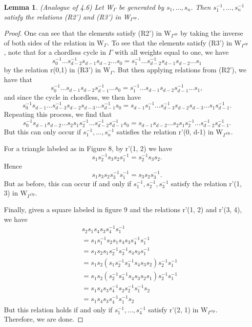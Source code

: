\documentclass[11pt]{amsart}
\newtheorem{lem}[thm]{Lemma}
\theoremstyle{definition}
\begin{document}
\begin{lem} (Analogue of 4.6) 
Let W$_{\Gamma}$ be generated by $s_{1}, \dots, s_{n}$. Then $s_{1}^{-1}, \dots, s_{n}^{-1}$ satisfy the relations (R2') and (R3') in W$_{\Gamma^{op}}$.
\end{lem}
\begin{proof}
One can see that the elements satisfy (R2') in W$_{\Gamma^{op}}$ by taking the inverse of both sides of the relation in W$_{\Gamma}$. To see that the elements satisfy (R3') in W$_{\Gamma^{op}}$, note that for a chordless cycle in $\Gamma$ with all weights equal to one, we have $$s_{0}^{-1}\dots s_{d-2}^{-1}s_{d-1}s_{d-2}\dots s_{0} = s_{1}^{-1}\dots s_{d-2}^{-1}s_{d-1}s_{d-2}\dots s_{1}$$ by the relation r(0,1) in (R3') in W$_{\Gamma}$. But then applying relations from (R2'), we have that $$s_{0}^{-1}\dots s_{d-1}s_{d-2}s_{d-1}^{-1}\dots s_{0} = s_{1}^{-1}\dots s_{d-1}s_{d-2}s_{d-1}^{-1}\dots s_{1},$$ and since the cycle in chordless, we then have $$s_{0}^{-1}s_{d-1}\dots s_{d-3}^{-1}s_{d-2}s_{d-3}\dots s_{d-1}^{-1}s_{0} = s_{d-1}s_{1}^{-1}\dots s_{d-3}^{-1}s_{d-2}s_{d-3}\dots s_{1}s_{d-1}^{-1}.$$ Repeating this process, we find that $$s_{0}^{-1}s_{d-1}s_{d-2}\dots s_{2}s_{1}s_{2}^{-1}\dots s_{d-2}^{-1}s_{d-1}^{-1}s_{0} = s_{d-1}s_{d-2}\dots s_{2}s_{1}s_{2}^{-1}\dots s_{d-2}^{-1}s_{d-1}^{-1}.$$ But this can only occur if $s_{1}^{-1}, \dots, s_{n}^{-1}$ satisfies the relation r'(0, d-1) in W$_{\Gamma^{Op}}.$ 

For a triangle labeled as in Figure 8, by r'(1, 2) we have $$s_{1}s_{2}^{-1}s_{3}s_{2}s_{1}^{-1} = s_{2}^{-1}s_{3}s_{2}.$$ Hence $$s_{1}s_{3}s_{2}s_{3}^{-1}s_{1}^{-1} = s_{3}s_{2}s_{3}^{-1}.$$ But as before, this can occur if and only if $s_{1}^{-1}, s_{2}^{-1}, s_{3}^{-1}$ satisfy the relation r'(1, 3) in W$_{\Gamma^{Op}}$.

Finally, given a square labeled in figure 9 and the relations r'(1, 2) and r'(3, 4), we have 
\begin{align*}
& s_{2}s_{1}s_{4}s_{3}s_{4}^{-1}s_{1}^{-1} \\
&= s_{1}s_{1}^{-1}s_{2}s_{1}s_{4}s_{3}s_{4}^{-1}s_{1}^{-1} \\
&= s_{1}s_{2}s_{1}s_{2}^{-1}s_{3}^{-1}s_{4}s_{3}s_{1}^{-1} \\
&= s_{1}s_{2}(s_{1}s_{2}^{-1}s_{3}^{-1}s_{4}s_{3}s_{2})s_{2}^{-1}s_{1}^{-1} \\
&= s_{1}s_{2}(s_{2}^{-1}s_{3}^{-1}s_{4}s_{3}s_{2}s_{1})s_{2}^{-1}s_{1}^{-1} \\
&= s_{1}s_{4}s_{3}s_{4}^{-1}s_{2}s_{2}^{-1}s_{1}^{-1}s_{2} \\
&= s_{1}s_{4}s_{3}s_{4}^{-1}s_{1}^{-1}s_{2}
\end{align*}
But this relation holds if and only if $s_{1}^{-1}, \dots, s_{4}^{-1}$ satisfy r'(2, 1) in W$_{\Gamma^{Op}}$. Therefore, we are done.
\end{proof}
\end{document}
